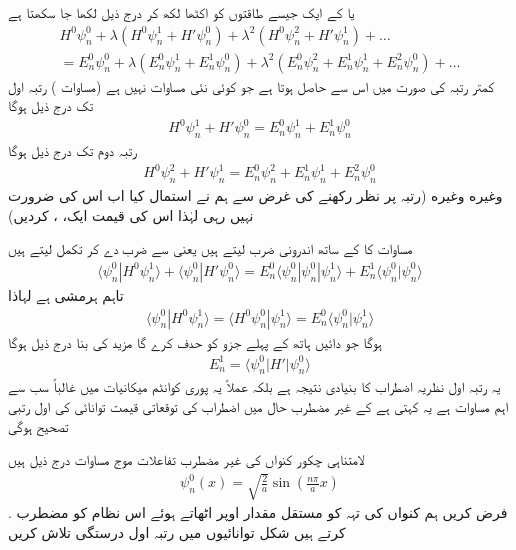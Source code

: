 یا  کے ایک جیسے طاقتوں کو اکٹھا لکھ کر درج ذیل لکھا جا سکھتا ہے 
\begin{multline*}
H^0 \psi_n^0 + \lambda (H^0 \psi_n^1 + H' \psi_n^0) + \lambda^2 (H^0 \psi_n^2 + H' \psi_n^1) + \dotsc \\
= E_n^0 \psi_n^0 + \lambda (E_n^0 \psi_n^1 + E_n^1 \psi_n^0) + \lambda^2 (E_n^0 \psi_n^2 + E_n^1 \psi_n^1 + E_n^2 \psi_n^0) + \dotsc
\end{multline*}
كمتر رتبہ  کی صورت میں اس سے  حاصل ہوتا ہے جو کوئی نئی مساوات نہیں ہے (مساوات ) رتبہ اول  تک درج ذیل ہوگا 
\begin{align}\label{مساوات_اضطراب_رتبہ_اول}
H^0 \psi_n^1 + H' \psi_n^0 = E_n^0 \psi_n^1 + E_n^1 \psi_n^0
\end{align}
رتبہ دوم  تک درج ذیل ہوگا 
\begin{align}\label{مساوات_اضطراب_رتبہ_دوم}
H^0 \psi_n^2 + H' \psi_n^1 = E_n^0 \psi_n^2 + E_n^1 \psi_n^1 + E_n^2 \psi_n^0
\end{align}
وغيره وغيره (رتبہ  پر نظر رکھنے کی غرض سے ہم نے  استمال کیا اب اس کی ضرورت نہیں رہی لہٰذا اس کی قیمت ایک، ، کردیں)

مساوات  کا  کے ساتھ اندرونی ضرب لیتے ہیں یعنی  سے ضرب دے کر تکمل لیتے ہیں 
\begin{align*}
\langle \psi_n^0 | H^0 \psi_n^1 \rangle + \langle \psi_n^0 | H' \psi_n^0 \rangle = E_n^0 \langle \psi_n^0 | \psi_n^0 | \psi_n^1 \rangle + E_n^1 \langle \psi_n^0 | \psi_n^0 \rangle
\end{align*}
تاہم  ہرمشی ہے لہاذا 
\begin{align*}
\langle \psi_n^0 | H^0 \psi_n^1 \rangle = \langle H^0 \psi_n^0 | \psi_n^1 \rangle = E_n^0 \langle \psi_n^0 | \psi_n^1 \rangle
\end{align*}
ہوگا جو دائیں ہاتھ کے پہلے  جزو کو حدف کرے گا مزيد  
کی بنا درج ذیل ہوگا 
\begin{align}
E_n^1 = \langle \psi_n^0 | H' | \psi_n^0 \rangle
\end{align}
یہ رتبہ اول نظریہ اضطراب کا بنیادی نتیجہ ہے بلکہ عملاً یہ پوری کوانٹم میکانیات میں غالباً سب سے اہم مساوات ہے یہ کہتی ہے کے غير مضطرب حال میں اضطراب کی توقعاتى قیمت توانائی کی  اول رتبی  تصحيح ہوگی 

لامتناہی چکور کنواں کی غیر مضطرب تفاعلات موج مساوات  درج ذیل ہیں  
\begin{align*}
\psi_n^0 (x) = \sqrt{\frac{2}{a}} \sin (\frac{n \pi}{a} x)
\end{align*}
. فرض کریں ہم کنواں کی تہہ کو مستقل مقدار  اوپر اٹھاتے ہوئے اس نظام کو مضطرب کرتے ہیں شکل  توانائیوں میں رتبہ اول درستگی تلاش کریں 

